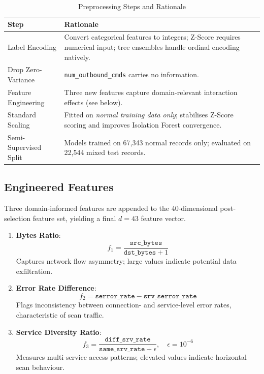 \documentclass[conference]{IEEEtran}
\begin{document}
\begin{table}[H]
  \centering
  \caption{Preprocessing Steps and Rationale}
  \label{tab:preproc}
  \begin{tabular}{p{2.8cm}p{5.0cm}}
    \toprule
    \textbf{Step} & \textbf{Rationale} \\
    \midrule
    Label Encoding         & Convert categorical features to integers; Z-Score requires numerical input; tree ensembles handle ordinal encoding natively. \\[3pt]
    Drop Zero-Variance     & \texttt{num\_outbound\_cmds} carries no information. \\[3pt]
    Feature Engineering    & Three new features capture domain-relevant interaction effects (see below). \\[3pt]
    Standard Scaling       & Fitted on \emph{normal training data only}; stabilises Z-Score scoring and improves Isolation Forest convergence. \\[3pt]
    Semi-Supervised Split  & Models trained on 67,343 normal records only; evaluated on 22,544 mixed test records. \\
    \bottomrule
  \end{tabular}
\end{table}

\subsection{Engineered Features}
Three domain-informed features are appended to the 40-dimensional post-selection
feature set, yielding a final $d=43$ feature vector.

\begin{enumerate}
  \item \textbf{Bytes Ratio}:
        \[
          f_1 = \frac{\texttt{src\_bytes}}{\texttt{dst\_bytes} + 1}
        \]
        Captures network flow asymmetry; large values indicate potential data
        exfiltration.

  \item \textbf{Error Rate Difference}:
        \[
          f_2 = \texttt{serror\_rate} - \texttt{srv\_serror\_rate}
        \]
        Flags inconsistency between connection- and service-level error rates,
        characteristic of scan traffic.

  \item \textbf{Service Diversity Ratio}:
        \[
          f_3 = \frac{\texttt{diff\_srv\_rate}}{\texttt{same\_srv\_rate} + \epsilon},
          \quad \epsilon = 10^{-6}
        \]
        Measures multi-service access patterns; elevated values indicate horizontal
        scan behaviour.
\end{enumerate}
\end{document}
